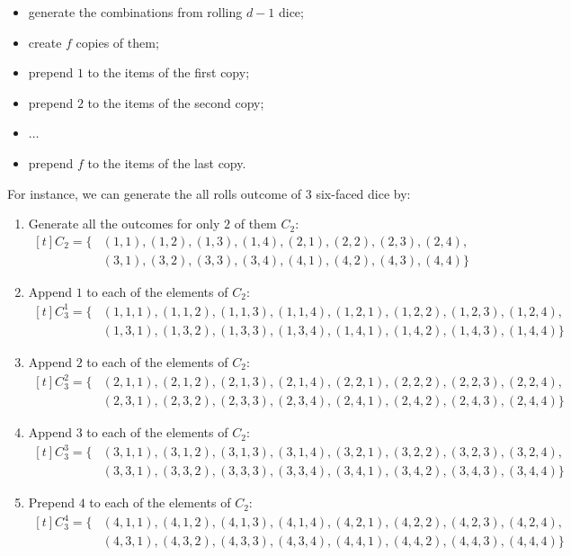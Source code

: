 \begin{itemize}
	\item generate the combinations from rolling $d-1$ dice;
	\item create $f$ copies of them;
	\item prepend $1$ to the items of the first copy;
	\item prepend $2$ to the items of the second copy;
	\item $\ldots$  
	\item prepend $f$ to the items of the last copy.
\end{itemize}


For instance, we can generate the all rolls outcome  of $3$ six-faced dice by:

\begin{enumerate}
	\item Generate all the outcomes for only $2$ of them $C_2$:\\
	$
	\!
	\begin{aligned}[t]
		C_2 =  \{
			& (1,1),(1,2),(1,3),	(1,4),	(2,1),	(2,2),	(2,3),	(2,4),\\
			&(3,1),	(3,2),	(3,3),	(3,4),	(4,1),	(4,2),	(4,3),	(4,4)\}
	\end{aligned}
	$ 
	

	\item Append $1$ to each of the elements of $C_2$:\\
	$
	\!
	\begin{aligned}[t]
		C_3^1 =  \{
			&(1,1,1),(1,1,2),(1,1,3),(1,1,4),(1,2,1),(1,2,2),(1,2,3),(1,2,4),\\
			&(1,3,1),(1,3,2),(1,3,3),(1,3,4),(1,4,1),(1,4,2),(1,4,3),(1,4,4)\}
	\end{aligned}
	$ 


	\item  Append $2$ to each of the elements of $C_2$: \\
	$
	\!
	\begin{aligned}[t]
		C_3^2 =  \{
			&(2,1,1),(2,1,2),(2,1,3),(2,1,4),(2,2,1),(2,2,2),(2,2,3),(2,2,4),\\
			&(2,3,1),(2,3,2),(2,3,3),(2,3,4),(2,4,1),(2,4,2),(2,4,3),(2,4,4)\}
	\end{aligned}
	$ 



	\item  Append $3$ to each of the elements of $C_2$:\\
	$
	\!
	\begin{aligned}[t]
		C_3^3 =  \{
			&(3,1,1),(3,1,2),(3,1,3),(3,1,4),(3,2,1),(3,2,2),(3,2,3),(3,2,4),\\
			&(3,3,1),(3,3,2),(3,3,3),(3,3,4),(3,4,1),(3,4,2),(3,4,3),(3,4,4)\}
	\end{aligned}
	$ 
	\item Prepend $4$ to each of the elements of $C_2$:\\
	$
	\!
	\begin{aligned}[t]
		C_3^4 =  \{
			& (4,1,1),(4,1,2),(4,1,3),(4,1,4),(4,2,1),(4,2,2),(4,2,3),(4,2,4),\\
			&(4,3,1),(4,3,2),(4,3,3),(4,3,4),(4,4,1),(4,4,2),(4,4,3),(4,4,4)\}
	\end{aligned}
	$ 


\end{enumerate}
